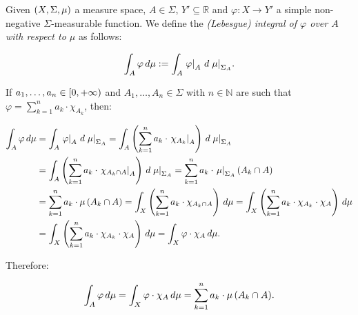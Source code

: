 \begin{remark}
  Given $\left(X,\Sigma,\mu\right)$ a measure space, $A\in\Sigma$, $Y'\subseteq\mathbb{R}$ and $\varphi:X\rightarrow Y'$ a simple non-negative $\Sigma$-measurable function. We define the\emph{ (Lebesgue) integral of $\varphi$ over $A$ with respect to $\mu$} as follows:

  \begin{equation}
    \int_{A}{\varphi\,d\mu}:=\int_{A}{\left.\varphi\right|_{A}\,d\left.\mu\right|_{\Sigma_A}}.
  \end{equation}

  If $a_1,\dots,a_n\in\left[0,+\infty\right)$ and $A_1,\dots,A_n\in\Sigma$ with $n\in\mathbb{N}$ are such that $\varphi=\sum_{k=1}^{n}{a_k\cdot\chi_{A_k}}$, then:

  \begin{equation}
    \begin{split}
      \int_{A}{\varphi\,d\mu} & =\int_{A}{\left.\varphi\right|_{A}\,d\left.\mu\right|_{\Sigma_A}}=\int_{A}{\left(\sum_{k=1}^{n}{a_k\cdot\left.\chi_{A_k}\right|_{A}}\right)\,d\left.\mu\right|_{\Sigma_A}}\\
      & =\int_{A}{\left(\sum_{k=1}^{n}{a_k\cdot\left.\chi_{A_k\cap A}\right|_{A}}\right)\,d\left.\mu\right|_{\Sigma_A}}=\sum_{k=1}^{n}{a_k\cdot\left.\mu\right|_{\Sigma_A}\left(A_k\cap A\right)}\\
      & =\sum_{k=1}^{n}{a_k\cdot\mu\left(A_k\cap A\right)}=\int_{X}{\left(\sum_{k=1}^{n}{a_k\cdot\chi_{A_k\cap A}}\right)\,d\mu}=\int_{X}{\left(\sum_{k=1}^{n}{a_k\cdot\chi_{A_k}\cdot\chi_A}\right)\,d\mu}\\
      & =\int_{X}{\left(\sum_{k=1}^{n}{a_k\cdot\chi_{A_k}}\cdot\chi_A\right)\,d\mu}=\int_{X}{\varphi\cdot\chi_A\,d\mu}.
    \end{split}
  \end{equation}

  Therefore:

  \begin{equation}
    \int_{A}{\varphi\,d\mu}=\int_{X}{\varphi\cdot\chi_A\,d\mu}=\sum_{k=1}^{n}{a_k\cdot\mu\left(A_k\cap A\right)}.
  \end{equation}
\end{remark}

